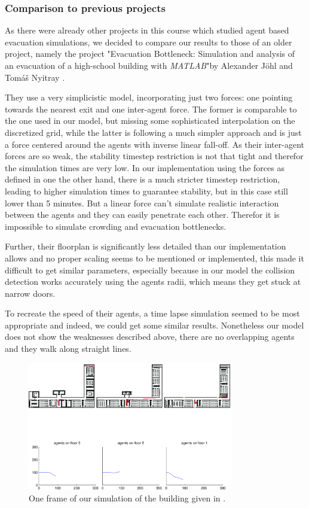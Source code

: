 \documentclass[11pt]{article}
\begin{document}
\subsubsection{Comparison to previous projects}

As there were already other projects in this course which studied agent based evacuation simulations, 
we decided to compare our results to those of an older project, namely the project 
"Evacuation Bottleneck: Simulation and analysis of an evacuation of a high-school building with \textit{MATLAB}"by
Alexander J\"ohl and Tom\'{a}\v{s} Nyitray \cite{oldproj}.

They use a very simplicistic model, incorporating just two forces: 
one pointing towards the nearest exit and one inter-agent force. The former is comparable to the one used in our model, but missing some
sophisticated interpolation on the discretized grid, while the latter is following a much simpler approach 
and is just a force centered around the agents with inverse linear fall-off.
As their inter-agent forces are so weak, the stability timestep restriction is not that tight and therefor the simulation times are very low.
In our implementation using the forces as defined in \cite{SDFEP} one the other hand, 
there is a much stricter timestep restriction, leading to higher simulation times to guarantee stability, but in this case still lower than 5 minutes.
But a linear force can't simulate realistic interaction between the agents and they can
easily penetrate each other. Therefor it is impossible to simulate crowding and evacuation bottlenecks.

Further, their floorplan is significantly less detailed than our implementation allows and no proper scaling seems
to be mentioned or implemented, this made it difficult to get similar parameters, especially because in our 
model the collision detection works accurately using the agents radii, which means they get stuck at narrow doors.

To recreate the speed of their agents, a time lapse simulation seemed to be most appropriate and indeed, we could get some similar 
results. Nonetheless our model does not show the weaknesses described above, there are no overlapping agents and they walk along straight lines.

\begin{figure}[h]
\centering
\includegraphics[width=0.8\textwidth]{./images/swsl.png}
\caption{One frame of our simulation of the building given in \cite{oldproj}.} 
\label{swsl}
\end{figure}
\end{document}
